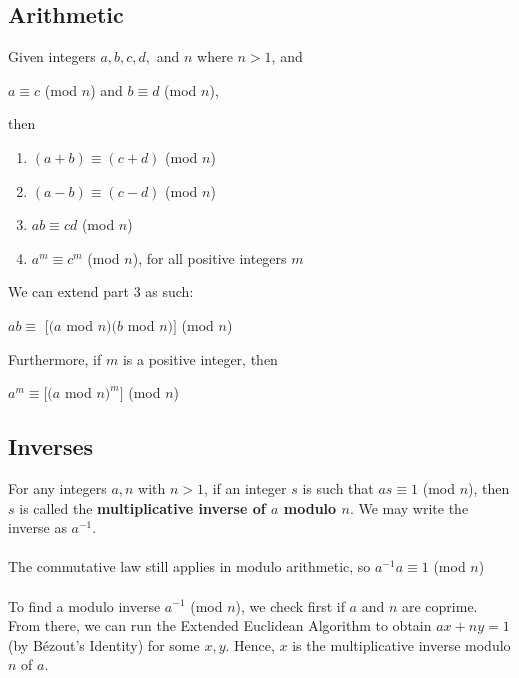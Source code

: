\documentclass[a4paper]{article}
\begin{document}
\subsection{Arithmetic}
Given integers $a, b, c, d,$ and $n$ where $n>1$, and
\begin{center}
	$a \equiv c$ (mod $n$) and $b \equiv d$ (mod $n$),
\end{center}
then
\begin{enumerate}
	\item $(a+b) \equiv (c+d)$ (mod $n$)
	\item $(a-b) \equiv (c-d)$ (mod $n$)
	\item $ab\equiv cd$ (mod $n$)
	\item $a^m \equiv c^m$ (mod $n$), for all positive integers $m$
\end{enumerate}
We can extend part 3 as such:\\
\begin{center}
	$ab \equiv$ $[(a$ mod $n)(b$ mod $n)]$ (mod $n$)
\end{center}
Furthermore, if $m$ is a positive integer, then
\begin{center}
	$a^m \equiv [(a$ mod $n)^m]$ (mod $n$)
\end{center}
\subsection{Inverses}
For any integers $a, n$ with $n>1$, if an integer $s$ is such that $as \equiv 1$ (mod $n$), then $s$ is called the \textbf{multiplicative inverse of $a$ modulo $n$}. We may write the inverse as $a^{-1}$.\\ \\
The commutative law still applies in modulo arithmetic, so $a^{-1}a \equiv 1$ (mod $n$)\\ \\
To find a modulo inverse $a^{-1}$ (mod $n$), we check first if $a$ and $n$ are coprime. From there, we can run the Extended Euclidean Algorithm to obtain $ax + ny = 1$ (by Bézout's Identity) for some $x, y$. Hence, $x$ is the multiplicative inverse modulo $n$ of $a$. 

\newpage
\appendix
\end{document}
